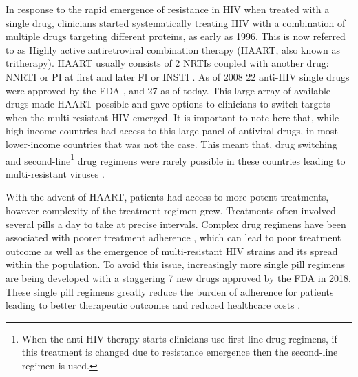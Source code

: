 \documentclass[
  11pt,
  twoside,
  BCOR=10mm,
  listof=totoc]{scrbook}
\begin{document}
In response to the rapid emergence of resistance in HIV when treated with a single drug, clinicians started systematically treating HIV with a combination of multiple drugs targeting different proteins, as early as 1996. This is now referred to as Highly active antiretroviral combination therapy (HAART, also known as tritherapy). HAART usually consists of 2 NRTIs coupled with another drug: NNRTI or PI at first and later FI or INSTI \autocite{yeniUpdateHAARTHIV2006}. As of 2008 22 anti-HIV single drugs were approved by the FDA \autocite{palmisanoBriefHistoryAntiretroviral2011}, and 27 as of today. This large array of available drugs made HAART possible and gave options to clinicians to switch targets when the multi-resistant HIV emerged. It is important to note here that, while high-income countries had access to this large panel of antiviral drugs, in most lower-income countries that was not the case. This meant that, drug switching and second-line\footnote{When the anti-HIV therapy starts clinicians use first-line drug regimens, if this treatment is changed due to resistance emergence then the second-line regimen is used.} drug regimens were rarely possible in these countries leading to multi-resistant viruses \autocite{penningsHIVDrugResistance2013}.

With the advent of HAART, patients had access to more potent treatments, however complexity of the treatment regimen grew. Treatments often involved several pills a day to take at precise intervals. Complex drug regimens have been associated with poorer treatment adherence \autocite{mehtaPotentialFactorsAffecting1997,millerComplianceTreatmentRegimens1997}, which can lead to poor treatment outcome as well as the emergence of multi-resistant HIV strains \autocite{chesneyAdherenceHIVCombination2000} and its spread within the population. To avoid this issue, increasingly more single pill regimens are being developed with a staggering 7 new drugs approved by the FDA in 2018. These single pill regimens greatly reduce the burden of adherence for patients leading to better therapeutic outcomes and reduced healthcare costs \autocite{aldirSingletabletRegimensHIV2014}.
\end{document}
